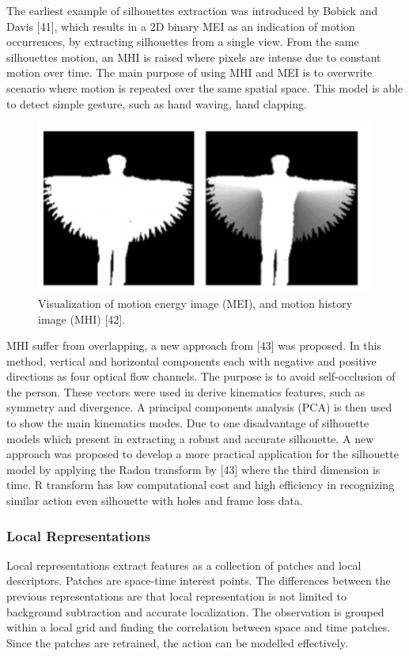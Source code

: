 The earliest example of silhouettes extraction was introduced by Bobick and Davis [41], which results in a 2D binary MEI as an indication of motion occurrences, by extracting silhouettes from a single view. From the same silhouettes motion, an MHI is raised where pixels are intense due to constant motion over time. The main purpose of using MHI and MEI is to overwrite scenario where motion is repeated over the same spatial space. This model is able to detect simple gesture, such as hand waving, hand clapping.   
\begin{figure}[ht]
\centering
\includegraphics{Figures/hg}
\decoRule
\caption[Visualization of motion energy image (MEI), and motion history image (MHI) "42"]{Visualization of motion energy image (MEI), and motion history image (MHI) [42].}
\label{fig:la1}
\end{figure}
MHI suffer from overlapping, a new approach from [43] was proposed. In this method, vertical and horizontal components each with negative and positive directions as four optical flow channels. The purpose is to avoid self-occlusion of the person. These vectors were used in derive kinematics features, such as symmetry and divergence. A principal components analysis (PCA) is then used to show the main kinematics modes. Due to one disadvantage of silhouette models which present in extracting a robust and accurate silhouette. A new approach was proposed to develop a more practical application for the silhouette model by applying the Radon transform by [43] where the third dimension is time. R transform has low computational cost and high efficiency in recognizing similar action even silhouette with holes and frame loss data. 


\subsubsection{Local Representations}
\hspace{5mm} Local representations extract features as a collection of patches and local descriptors. Patches are space-time interest points. The differences between the previous representations are that local representation is not limited to background subtraction and accurate localization. The observation is grouped within a local grid and finding the correlation between space and time patches. Since the patches are retrained, the action can be modelled effectively.\\

